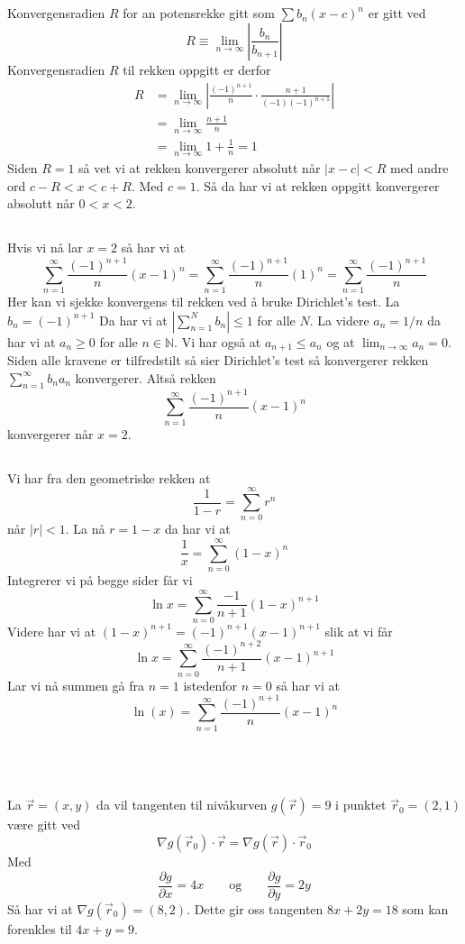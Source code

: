 \documentclass[12pt, a4paper,norsk]{article}
\newcommand{\oppgave}{\,\section{}}
\newcommand{\deloppgave}{\subsection{}}
\newcommand{\pdiff}[2][]{\frac{\partial#1}{\partial #2}}
\begin{document}
	\deloppgave
	Konvergensradien $R$ for an potensrekke gitt som $\sum b_n(x - c)^n$ er gitt ved
	$$
	R \equiv \lim_{n\to\infty}\left|\frac{b_n}{b_{n+1}}\right|
	$$
	Konvergensradien $R$ til rekken oppgitt er derfor
	\begin{align*}
	R &= \lim_{n\to\infty}\left|\frac{\left(-1\right)^{n+1}}{n}\cdot\frac{n+1}{(-1)\left(-1\right)^{n+1}}\right|\\
	&= \lim_{n\to\infty}\frac{n+1}{n} \\
	&= \lim_{n\to\infty}1 + \frac{1}{n} = 1
	\end{align*}
	Siden $R = 1$ så vet vi at rekken konvergerer absolutt når $|x - c| < R$ med andre ord $c - R < x < c + R$. Med $c = 1$. Så da har vi at rekken oppgitt konvergerer absolutt når $0 < x < 2$.
	
	\deloppgave
	Hvis vi nå lar $x = 2$ så har vi at
	$$
	\sum_{n = 1}^\infty \frac{\left(-1\right)^{n+1}}{n}(x-1)^n = \sum_{n = 1}^\infty \frac{\left(-1\right)^{n+1}}{n}(1)^n = \sum_{n = 1}^\infty \frac{\left(-1\right)^{n+1}}{n}
	$$
	Her kan vi sjekke konvergens til rekken ved å bruke Dirichlet's test. La $b_n = (-1)^{n+1}$ Da har vi at $\left|\sum_{n = 1}^N b_n\right| \leq 1$ for alle $N$. La videre $a_n = 1/n$ da har vi at $a_n \geq 0$ for alle $n\in\mathbb N$. Vi har også at $a_{n+1} \leq a_n$ og at $\lim_{n\to\infty} a_n = 0$. Siden alle kravene er tilfredstilt så sier Dirichlet's test så konvergerer rekken $\sum_{n = 1}^\infty b_na_n$ konvergerer. Altså rekken
	$$
	\sum_{n = 1}^\infty \frac{\left(-1\right)^{n+1}}{n}(x-1)^n
	$$
	konvergerer når $x = 2$.
	
	\deloppgave
	Vi har fra den geometriske rekken at
	$$
	\frac{1}{1 - r} = \sum_{n = 0}^\infty r^n
	$$
	når $|r| < 1$. La nå $r = 1 - x$ da har vi at
	$$
	\frac{1}{x} = \sum_{n = 0}^\infty (1 - x)^n
	$$
	Integrerer vi på begge sider får vi
	$$
	\ln{x} = \sum_{n = 0}^\infty \frac{-1}{n+1}(1 - x)^{n+1}
	$$
	Videre har vi at $(1 - x)^{n+1} = (-1)^{n+1}(x - 1)^{n+1}$ slik at vi får
	$$
	\ln{x} = \sum_{n = 0}^\infty \frac{(-1)^{n+2}}{n+1}(x - 1)^{n+1}
	$$
	Lar vi nå summen gå fra $n = 1$ istedenfor $n = 0$ så har vi at
	$$
	\ln(x) = \sum_{n = 1}^\infty \frac{(-1)^{n+1}}{n}(x - 1)^{n}
	$$
	
	\oppgave
	La $\vec{r} = (x, y)$ da vil tangenten til nivåkurven $g(\vec{r}) = 9$ i punktet $\vec{r}_0 = (2, 1)$ være gitt ved
	$$
	\nabla g(\vec{r}_0)\cdot \vec{r} = \nabla g(\vec{r})\cdot \vec{r}_0
	$$
	Med
	$$
	\pdiff[g]{x} = 4x \qquad \text{og} \qquad \pdiff[g]{y} = 2y
	$$
	Så har vi at $\nabla g(\vec{r}_0) = (8, 2)$. Dette gir oss tangenten $8x + 2y = 18$ som kan forenkles til $4x + y = 9$.
\end{document}
